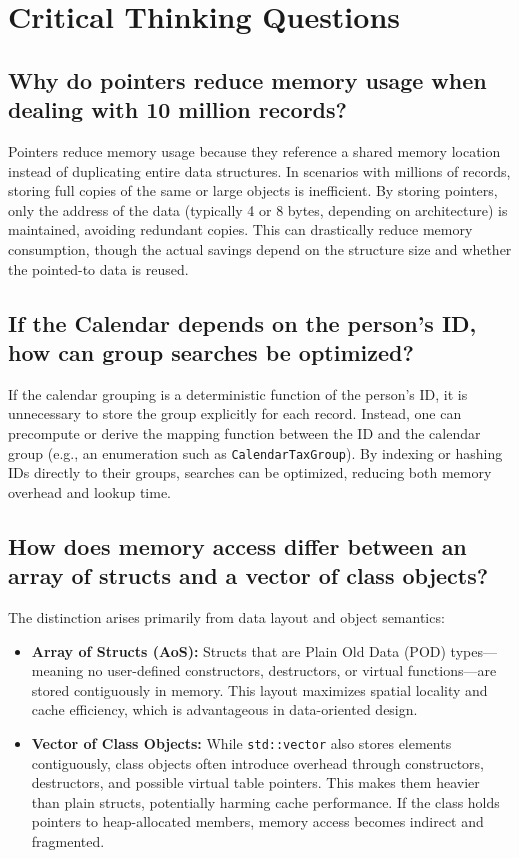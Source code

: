 \documentclass[11pt,letterpaper,oneside]{article}
\begin{document}
\section{Critical Thinking Questions}

\subsection{Why do pointers reduce memory usage when dealing with 10 million records?}

Pointers reduce memory usage because they reference a shared memory location
instead of duplicating entire data structures. In scenarios with millions of
records, storing full copies of the same or large objects is inefficient. By
storing pointers, only the address of the data (typically 4 or 8 bytes,
depending on architecture) is maintained, avoiding redundant copies. This can
drastically reduce memory consumption, though the actual savings depend on the
structure size and whether the pointed-to data is reused.

\subsection{If the Calendar depends on the person's ID, how can group searches be optimized?}

If the calendar grouping is a deterministic function of the person’s ID, it is
unnecessary to store the group explicitly for each record. Instead, one can
precompute or derive the mapping function between the ID and the calendar group
(e.g., an enumeration such as \texttt{CalendarTaxGroup}). By indexing or hashing
IDs directly to their groups, searches can be optimized, reducing both memory
overhead and lookup time.

\subsection{How does memory access differ between an array of structs and a vector of class objects?}

The distinction arises primarily from data layout and object semantics:

\begin{itemize}
    \item \textbf{Array of Structs (AoS):} Structs that are Plain Old Data (POD)
    types—meaning no user-defined constructors, destructors, or virtual
    functions—are stored contiguously in memory. This layout maximizes spatial
    locality and cache efficiency, which is advantageous in data-oriented
    design.
    \item \textbf{Vector of Class Objects:} While \texttt{std::vector} also
    stores elements contiguously, class objects often introduce overhead through
    constructors, destructors, and possible virtual table pointers. This makes
    them heavier than plain structs, potentially harming cache performance. If
    the class holds pointers to heap-allocated members, memory access becomes
    indirect and fragmented.
\end{itemize}
\end{document}
